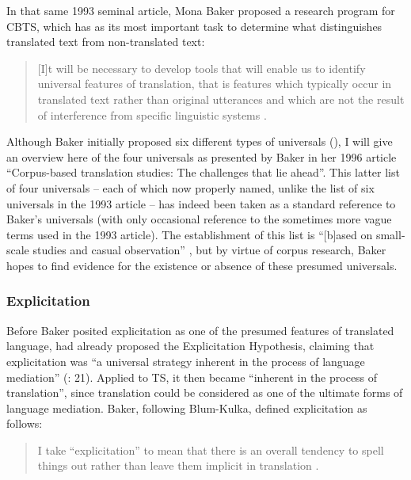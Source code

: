 In that same 1993 seminal article, Mona Baker proposed a research program for CBTS, which has as its most important task to determine what distinguishes translated text from non-translated text:


\begin{quote}
[I]t will be necessary to develop tools that will enable us to identify universal features of translation, that is features which typically occur in translated text rather than original utterances and which are not the result of interference from specific linguistic systems \citep[243]{baker_corpus_1993}.
\end{quote}


Although Baker initially proposed six different types of universals (\citeyear[243-245]{baker_corpus_1993}), I will give an overview here of the four universals as presented by Baker in her 1996 article “Corpus-based translation studies: The challenges that lie ahead”. This latter list of four universals – each of which now properly named, unlike the list of six universals in the 1993 article – has indeed been taken as a standard reference to Baker’s universals (with only occasional reference to the sometimes more vague terms used in the 1993 article). The establishment of this list is “[b]ased on small-scale studies and casual observation” \citep[243]{baker_corpus_1993}, but by virtue of corpus research, Baker hopes to find evidence for the existence or absence of these presumed universals.


\subsubsection{\label{sec:2.2.2.1}  Explicitation}

Before Baker posited explicitation as one of the presumed features of translated language, \citet{house_shifts_1986} had already proposed the Explicitation Hypothesis, claiming that explicitation was “a universal strategy inherent in the process of language mediation” (\citealt{house_shifts_1986}: 21). Applied to TS, it then became “inherent in the process of translation”, since translation could be considered as one of the ultimate forms of language mediation. Baker, following Blum-Kulka, defined explicitation as follows:


\begin{quote}
I take “explicitation” to mean that there is an overall tendency to spell things out rather than leave them implicit in translation \citep[180]{Baker1996}.
\end{quote}


